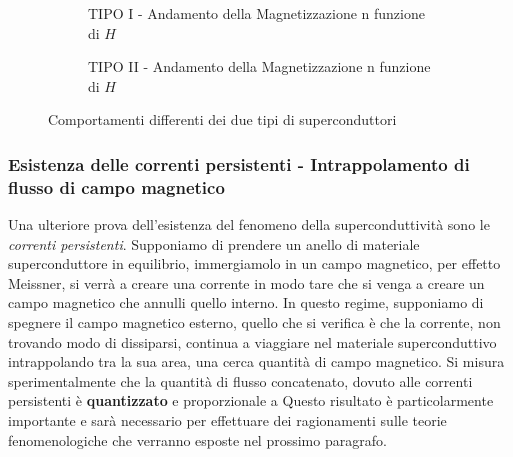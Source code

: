 \begin{figure}[H]
\begin{subfigure}[b]{0.4\textwidth}
{
	}
	\caption{TIPO I - Andamento della Magnetizzazione n funzione di $H$}
	\end{subfigure}
	\qquad\quad
        \begin{subfigure}[b]{0.4\textwidth}
	\caption{TIPO II - Andamento della Magnetizzazione n funzione di $H$}
	\end{subfigure}
	\caption{Comportamenti differenti dei due tipi di superconduttori}
	\label{SUPER:TIPI2}
\end{figure}

\subsubsection{Esistenza delle correnti persistenti - Intrappolamento di flusso di campo magnetico}
Una ulteriore prova dell'esistenza del fenomeno della superconduttivit\`a sono le \textit{correnti persistenti}. Supponiamo di prendere un anello di materiale superconduttore in equilibrio, immergiamolo in un campo magnetico, per effetto Meissner, si verr\`a a creare una corrente in modo tare che si venga a creare un campo magnetico che annulli quello interno. In questo regime, supponiamo di spegnere il campo magnetico esterno, quello che si verifica \`e che la corrente, non trovando modo di dissiparsi, continua a viaggiare nel materiale superconduttivo intrappolando tra la sua area, una cerca quantit\`a di campo magnetico. Si misura sperimentalmente che la quantit\`a di flusso concatenato, dovuto alle correnti persistenti \`e \textbf{quantizzato} e proporzionale a
Questo risultato \`e particolarmente importante e sar\`a necessario per effettuare dei ragionamenti sulle teorie fenomenologiche che verranno esposte nel prossimo paragrafo.
